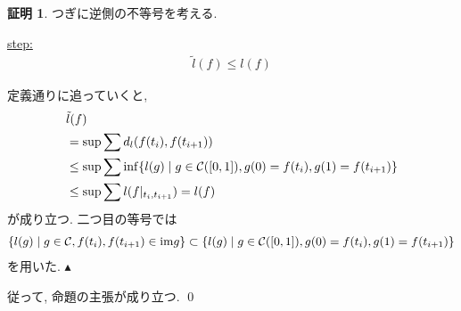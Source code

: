 \documentclass[10pt, fleqn, label-section=none]{bxjsarticle}
\theoremstyle{definition}
\newtheorem*{pf*}{証明}
\newcommand{\cbra}[1]{\mleft\{#1\mright\}}
\renewcommand{\;}{\, ; \,}
\newenvironment{claim}[1]{\par\noindent\underline{step:}\space#1}{}
\newenvironment{claimproof}[1]{\par\noindent{($\because$)}\space#1}{\hfill $\blacktriangle $}
\begin{document}
\begin{pf*}
つぎに逆側の不等号を考える.
\begin{claim}
\begin{align*} \tilde l (f) \leq l (f)  \end{align*}
\end{claim}
\begin{claimproof}
定義通りに追っていくと, 
\begin{align*}
&\tilde l (f) \\
&=  \sup \sum d_l (f(t_i), f(t_{i+1} ))   \\
&\leq \sup \sum \inf \cbra{l (g) \mid g \in \mathcal C([0,1]), g(0) = f(t_{i}), g(1) = f(t_{i+1})} \\
&\leq \sup \sum l(f |_{t_i, t_{i+1}}) = l(f) \end{align*}
が成り立つ. 二つ目の等号では
\begin{align*} \cbra{l (g) \mid g \in \mathcal C, f(t_{i}), f(t_{i+1}) \in \textrm{im} g }  \subset \cbra{l (g) \mid g \in \mathcal C([0,1]), g(0) = f(t_{i}), g(1) = f(t_{i+1})}   \end{align*}
を用いた. 
\end{claimproof}

従って, 命題の主張が成り立つ. 
\qed
\end{pf*}
\end{document}
